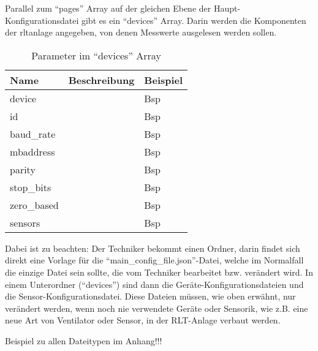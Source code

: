 \begin{enumerate}
		
	Parallel zum \enquote{pages} Array \bzw auf der gleichen Ebene der Haupt-Konfigurationsdatei gibt es ein \enquote{devices} Array. Darin werden die Komponenten der \acs{rltanlage} angegeben, von denen Messwerte ausgelesen werden sollen.
	
	\begin{table}[H]
		\caption{Parameter im \enquote{devices} Array}
		\label{tab:devices_array_parameter}
		\begin{tabular}{p{} p{} | p{}}
			\toprule
			\textbf{Name} & \textbf{Beschreibung} & \textbf{Beispiel} \\
			\midrule
			device     	&  & Bsp \\
			id         	&  & Bsp \\
			baud\_rate	&  & Bsp \\
			mbaddress	&  & Bsp \\
			parity	&  & Bsp \\
			stop\_bits	&  & Bsp \\
			zero\_based	&  & Bsp \\
			sensors	&  & Bsp \\
			\bottomrule
		\end{tabular}
	\end{table} 
	
\end{enumerate}

Dabei ist zu beachten:
Der Techniker bekommt einen Ordner, darin findet sich direkt eine Vorlage für die \enquote{main\_config\_file.json}-Datei, welche im Normalfall die einzige Datei sein sollte, die vom Techniker bearbeitet bzw. verändert wird.
In einem Unterordner (\enquote{devices}) sind dann die Geräte-Konfigurationsdateien und die Sensor-Konfigurationsdatei. Diese Dateien müssen, wie oben erwähnt, nur verändert werden, wenn noch nie verwendete Geräte oder Sensorik, wie z.B. eine neue Art von Ventilator oder Sensor, in der RLT-Anlage verbaut werden.

Beispiel zu allen Dateitypen im Anhang!!!




